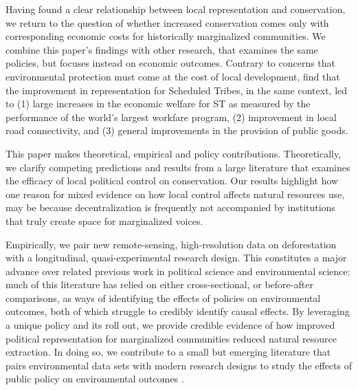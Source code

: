 \documentclass[12pt,reqno]{article}
\begin{document}




Having found a clear relationship between local representation and conservation, we return to the question of whether increased conservation comes only with corresponding economic costs for historically marginalized communities. We combine this paper's findings with other research, that examines the same policies, but focuses instead on economic outcomes. Contrary to concerns that environmental protection must come at the cost of local development, \textcite{gulzar2019} find that the improvement in representation for Scheduled Tribes, in the same context, led to (1) large increases in the economic welfare for ST as measured by the performance of the world's largest workfare program, (2) improvement in local road connectivity, and (3) general improvements in the provision of public goods.%


This paper makes theoretical, empirical and policy contributions. Theoretically, we clarify competing predictions and results from a large literature that examines the efficacy of local political control on conservation. Our results highlight how one reason for mixed evidence on how local control affects natural resources use, may be because decentralization is frequently not accompanied by institutions that truly create space for marginalized voices.  

Empirically, we pair new remote-sensing, high-resolution data on deforestation with a longitudinal, quasi-experimental research design. This constitutes a major advance over related previous work in political science and environmental science: much of this literature has relied on either cross-sectional, or before-after comparisons, as ways of identifying the effects of policies on environmental outcomes, both of which struggle to credibly identify causal effects. By leveraging a unique policy and its roll out, we provide credible evidence of how improved political representation for marginalized communities reduced natural resource extraction. In doing so, we contribute to a small but emerging literature that pairs environmental data sets with modern research designs to study the effects of public policy on environmental outcomes \parencite{ferraro2020conditional, baragwanath2020collective,sanford2021democratization}.
\end{document}
